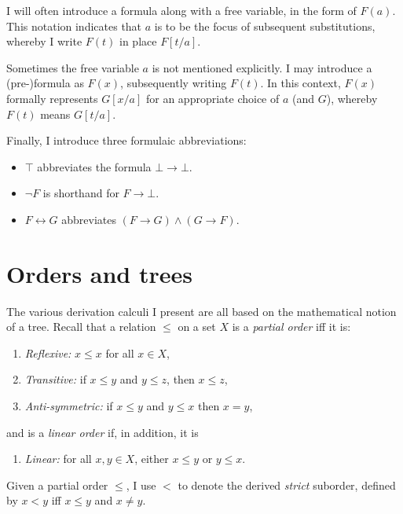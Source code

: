 \begin{convention}\label{conv-subst}
	I will often introduce a formula along with a free variable, in the form of \( F(a) \). 
	This notation indicates that \( a \) is to be the focus of subsequent substitutions, whereby I write \( F(t) \) in place \( F[t/a] \).
	
	Sometimes the free variable \( a \) is not mentioned explicitly.
	I may introduce a (pre-)formula as \( F(x) \), subsequently writing \( F(t) \).
	In this context, \( F(x) \) formally represents \( G[x/a] \) for an appropriate choice of \( a \) (and \( G \)), whereby \( F(t) \) means \( G[t/a] \).
\end{convention}


Finally, I introduce three formulaic abbreviations:
\begin{itemize}
	\item \( ⊤ \) abbreviates the formula \( ⊥ → ⊥ \).
	\item \( ¬ F \) is shorthand for \( F → ⊥ \).
	\item \( F ↔ G \) abbreviates \( ( F → G ) ∧ ( G → F ) \).
\end{itemize}


\section{Orders and trees}

The various derivation calculi I present are all based on the mathematical notion of a tree.
Recall that a relation \( ≤ \) on a set \( X \) is a \emph{partial order} iff it is:
\begin{enumerate}
	\item \emph{Reflexive:} \( x ≤ x \) for all \( x ∈ X \),
	\item \emph{Transitive:} if \( x ≤ y \) and \( y ≤ z \), then \( x ≤ z \),
	\item \emph{Anti-symmetric:} if \( x ≤ y \) and \( y ≤ x \) then \( x = y \),
\end{enumerate}
%
and is a \emph{linear order} if, in addition, it is
\begin{enumerate}[resume]
	\item \emph{Linear:} for all \( x,y ∈ X \), either \( x ≤ y \) or \( y ≤ x \).
\end{enumerate}
%
Given a partial order \( ≤ \), I use \( < \) to denote the derived \emph{strict} suborder, defined by \( x < y \) iff \( x ≤ y \) and \( x ≠ y \).

